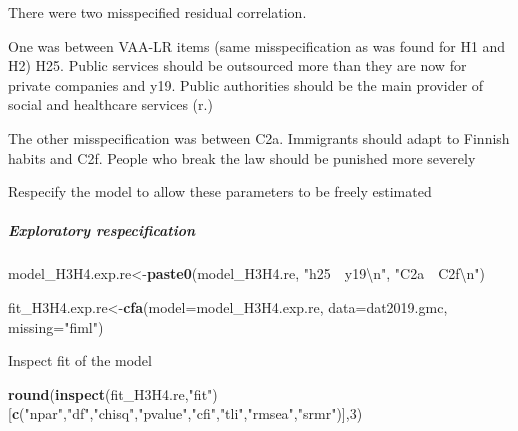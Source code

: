 \documentclass[
]{article}
\newenvironment{Shaded}{\begin{snugshade}}{\end{snugshade}}
\newcommand{\CharTok}[1]{\textcolor[rgb]{0.31,0.60,0.02}{#1}}
\newcommand{\DataTypeTok}[1]{\textcolor[rgb]{0.13,0.29,0.53}{#1}}
\newcommand{\DecValTok}[1]{\textcolor[rgb]{0.00,0.00,0.81}{#1}}
\newcommand{\KeywordTok}[1]{\textcolor[rgb]{0.13,0.29,0.53}{\textbf{#1}}}
\newcommand{\NormalTok}[1]{#1}
\newcommand{\StringTok}[1]{\textcolor[rgb]{0.31,0.60,0.02}{#1}}
\begin{document}
There were two misspecified residual correlation.

One was between VAA-LR items (same misspecification as was found for H1
and H2) H25. Public services should be outsourced more than they are now
for private companies and y19. Public authorities should be the main
provider of social and healthcare services (r.)

The other misspecification was between C2a. Immigrants should adapt to
Finnish habits and C2f. People who break the law should be punished more
severely

Respecify the model to allow these parameters to be freely estimated

\hypertarget{exploratory-respecification-2}{%
\subparagraph{Exploratory
respecification}\label{exploratory-respecification-2}}

\begin{Shaded}
\begin{Highlighting}[]
\NormalTok{model_H3H4.exp.re<-}\KeywordTok{paste0}\NormalTok{(model_H3H4.re,}
                      \StringTok{"h25~~y19}\CharTok{\textbackslash{}n}\StringTok{"}\NormalTok{,}
                      \StringTok{"C2a~~C2f}\CharTok{\textbackslash{}n}\StringTok{"}\NormalTok{)}
\end{Highlighting}
\end{Shaded}

\begin{Shaded}
\begin{Highlighting}[]
\NormalTok{fit_H3H4.exp.re<-}\KeywordTok{cfa}\NormalTok{(}\DataTypeTok{model=}\NormalTok{model_H3H4.exp.re,}
              \DataTypeTok{data=}\NormalTok{dat2019.gmc,}
              \DataTypeTok{missing=}\StringTok{"fiml"}\NormalTok{)}
\end{Highlighting}
\end{Shaded}

Inspect fit of the model

\begin{Shaded}
\begin{Highlighting}[]
\KeywordTok{round}\NormalTok{(}\KeywordTok{inspect}\NormalTok{(fit_H3H4.re,}\StringTok{"fit"}\NormalTok{)}
\NormalTok{      [}\KeywordTok{c}\NormalTok{(}\StringTok{"npar"}\NormalTok{,}\StringTok{"df"}\NormalTok{,}\StringTok{"chisq"}\NormalTok{,}\StringTok{"pvalue"}\NormalTok{,}\StringTok{"cfi"}\NormalTok{,}\StringTok{"tli"}\NormalTok{,}\StringTok{"rmsea"}\NormalTok{,}\StringTok{"srmr"}\NormalTok{)],}\DecValTok{3}\NormalTok{)}
\end{Highlighting}
\end{Shaded}
\end{document}
